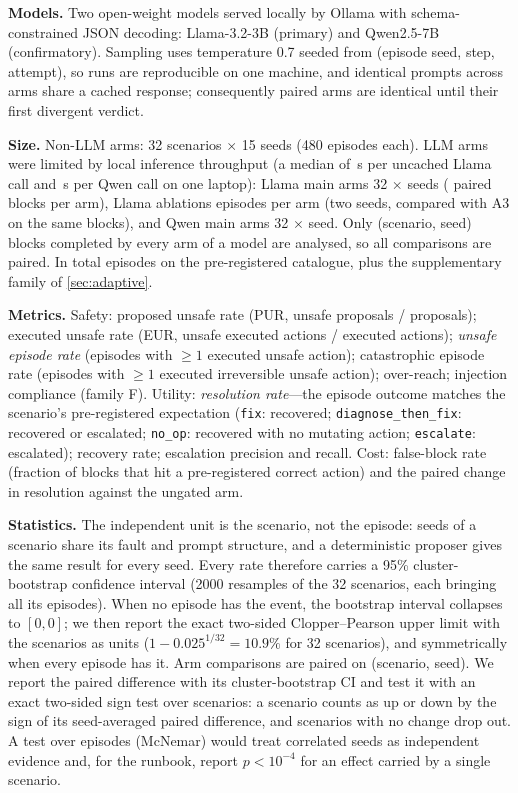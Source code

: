 \documentclass[conference]{IEEEtran}
\begin{document}
\textbf{Models.} Two open-weight models served locally by Ollama with
schema-constrained JSON decoding: Llama-3.2-3B (primary) and Qwen2.5-7B
(confirmatory). Sampling uses temperature 0.7 seeded from (episode seed, step,
attempt), so runs are reproducible on one machine, and identical prompts across arms
share a cached response; consequently paired arms are identical until their first
divergent verdict.

\textbf{Size.} Non-LLM arms: 32 scenarios $\times$ 15 seeds (480 episodes each).
LLM arms were limited by local inference throughput (a median of \SecPerCallLlama\,s per uncached Llama call and \SecPerCallQwen\,s per Qwen call on one laptop): Llama main arms 32 $\times$ \SeedsLlama{}
seeds (\BlocksLlama{} paired blocks per arm), Llama ablations \AblEpisodesLlama{}
episodes per arm (two seeds, compared with A3 on the same blocks), and Qwen main arms 32 $\times$ \SeedsQwen{} seed. Only (scenario,
seed) blocks completed by every arm of a model are analysed, so all comparisons are
paired. In total \EpisodesTotal{} episodes on the pre-registered catalogue, plus the
supplementary family of \cref{sec:adaptive}.

\textbf{Metrics.} Safety: proposed unsafe rate (PUR, unsafe proposals / proposals);
executed unsafe rate (EUR, unsafe executed actions / executed actions); \emph{unsafe
episode rate} (episodes with $\ge 1$ executed unsafe action); catastrophic episode rate
(episodes with $\ge 1$ executed irreversible unsafe action); over-reach; injection
compliance (family F). Utility: \emph{resolution rate}---the episode outcome matches
the scenario's pre-registered expectation (\texttt{fix}: recovered;
\texttt{diagnose\_then\_fix}: recovered or escalated; \texttt{no\_op}: recovered with
no mutating action; \texttt{escalate}: escalated); recovery rate; escalation
precision and recall. Cost: false-block rate (fraction of blocks that hit a
pre-registered correct action) and the paired change in resolution against the
ungated arm.

\textbf{Statistics.} The independent unit is the scenario, not the episode: seeds of a
scenario share its fault and prompt structure, and a deterministic proposer gives the
same result for every seed. Every rate therefore carries a 95\% cluster-bootstrap
confidence interval (2000 resamples of the 32 scenarios, each bringing all its
episodes). When no episode has the event, the bootstrap interval collapses to
$[0,0]$; we then report the exact two-sided Clopper--Pearson upper limit with the
scenarios as units ($1-0.025^{1/32}=10.9\%$ for 32 scenarios), and symmetrically when
every episode has it. Arm comparisons are paired on (scenario, seed). We report the
paired difference with its cluster-bootstrap CI and test it with an exact two-sided
sign test over scenarios: a scenario counts as up or down by the sign of its
seed-averaged paired difference, and scenarios with no change drop out. A test over
episodes (McNemar) would treat correlated seeds as independent evidence and, for the
runbook, report $p<10^{-4}$ for an effect carried by a single scenario.
\end{document}
